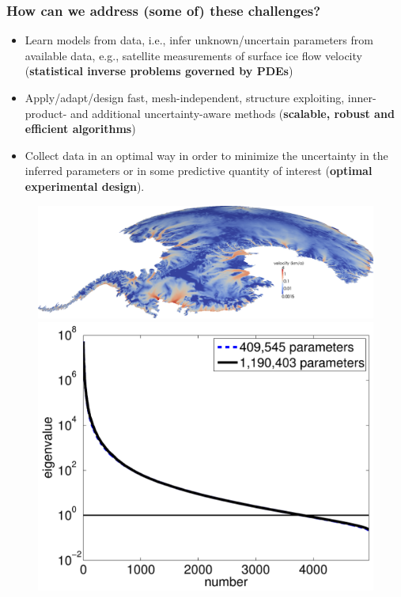 \documentclass[10pt,final,xcolor=dvipsnames]{beamer}
\begin{document}
\begin{frame}
  \frametitle{How can we address (some of) these challenges?}

  \begin{minipage}{.6\columnwidth}
    \begin{itemize}
    \item Learn models from data, i.e., infer unknown/uncertain
      parameters from available data, e.g., satellite measurements of
      surface ice flow velocity ({\bf statistical inverse problems
        governed by PDEs})
    \item Apply/adapt/design fast, mesh-independent, structure
      exploiting, inner-product- and additional uncertainty-aware
      methods ({\bf scalable, robust and efficient algorithms})
    \item Collect data in an optimal way in order to minimize the
      uncertainty in the inferred parameters or in some predictive
      quantity of interest ({\bf optimal experimental design}).
    \end{itemize}
  \end{minipage}\hfill
  \begin{minipage}{.4\columnwidth}
    \begin{figure}\centering
      \includegraphics[width=0.99\columnwidth]{extraplots/antarctica_uobs_rotsurface_larger}\\
      \vspace{0.2in}
      \centering\includegraphics[width=0.65\columnwidth]{extraplots/spec_ppmisfit_hess_coarseandfine_new.pdf}
    \end{figure}
  \end{minipage}


\end{frame}
\end{document}
